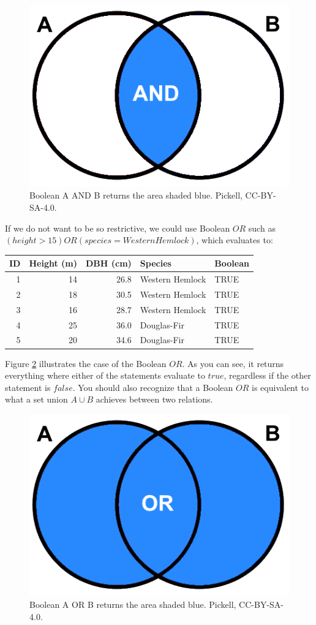\documentclass[
]{book}
\begin{document}
\begin{figure}
\includegraphics[width=0.5\linewidth]{images/05-boolean-and} \caption{Boolean A AND B returns the area shaded blue. Pickell, CC-BY-SA-4.0.}\label{fig:5-boolean-and}
\end{figure}

If we do not want to be so restrictive, we could use Boolean \(OR\) such as \((height>15)OR(species=WesternHemlock)\), which evaluates to:

\begin{tabular}{rrrll}
\toprule
ID & Height (m) & DBH (cm) & Species & Boolean\\
\midrule
1 & 14 & 26.8 & Western Hemlock & TRUE\\
2 & 18 & 30.5 & Western Hemlock & TRUE\\
3 & 16 & 28.7 & Western Hemlock & TRUE\\
4 & 25 & 36.0 & Douglas-Fir & TRUE\\
5 & 20 & 34.6 & Douglas-Fir & TRUE\\
\bottomrule
\end{tabular}

Figure \ref{fig:5-boolean-or} illustrates the case of the Boolean \(OR\). As you can see, it returns everything where either of the statements evaluate to \(true\), regardless if the other statement is \(false\). You should also recognize that a Boolean \(OR\) is equivalent to what a set union \(A∪B\) achieves between two relations.

\begin{figure}
\includegraphics[width=0.5\linewidth]{images/05-boolean-or} \caption{Boolean A OR B returns the area shaded blue. Pickell, CC-BY-SA-4.0.}\label{fig:5-boolean-or}
\end{figure}
\end{document}
